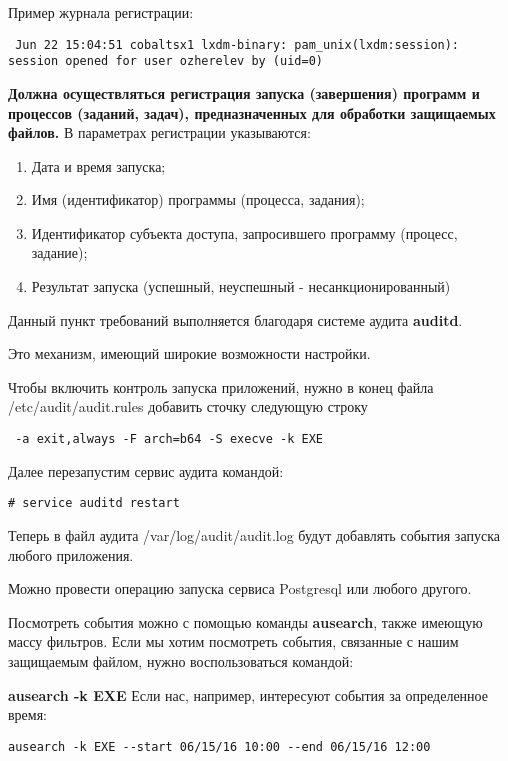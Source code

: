 \documentclass[a4paper,10pt,twoside]{article}
\begin{document}
Пример журнала регистрации:
\begin{verbatim}
 Jun 22 15:04:51 cobaltsx1 lxdm-binary: pam_unix(lxdm:session): session opened for user ozherelev by (uid=0)
\end{verbatim} 

 \textbf{Должна осуществляться регистрация запуска (завершения) программ и процессов (заданий, задач), предназначенных для обработки защищаемых файлов.} В параметрах регистрации указываются:
\begin{enumerate}
\item Дата и время запуска; 
\item Имя (идентификатор) программы (процесса, задания); 
\item Идентификатор субъекта доступа, запросившего программу (процесс, задание); 
\item Результат запуска (успешный, неуспешный - несанкционированный)
\end{enumerate}



Данный пункт требований выполняется благодаря системе аудита \textbf{auditd}.

Это механизм, имеющий широкие возможности настройки.

Чтобы включить контроль запуска приложений, нужно  в конец файла /etc/audit/audit.rules добавить сточку  следующую строку
\begin{verbatim}
 -a exit,always -F arch=b64 -S execve -k EXE
\end{verbatim} 
 Далее перезапустим сервис аудита командой:
 
\begin{verbatim}
# service auditd restart
\end{verbatim} 
Теперь в файл аудита /var/log/audit/audit.log будут добавлять события запуска любого приложения. 

Можно провести операцию запуска сервиса Postgresql или любого другого.

Посмотреть события можно с помощью команды \textbf{ausearch}, также имеющую массу фильтров. Если  мы хотим посмотреть события, связанные с нашим защищаемым файлом, нужно воспользоваться командой:

\textbf{ausearch -k EXE}
Если нас, например, интересуют события за определенное время:
\begin{verbatim}
ausearch -k EXE --start 06/15/16 10:00 --end 06/15/16 12:00
\end{verbatim} 
\end{document}
